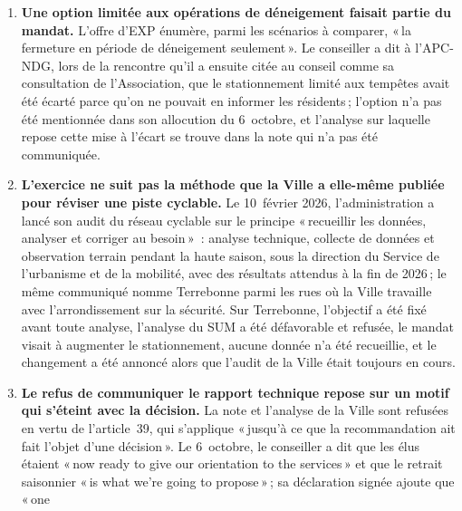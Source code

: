 \documentclass[11pt,letterpaper]{article}
\begin{document}
\begin{enumerate}[nosep]
\item \begin{minipage}[t]{\linewidth}\textbf{Une option limitée aux opérations de déneigement
    faisait partie du mandat.} L'offre d'EXP énumère, parmi les scénarios à
    comparer, «\,la fermeture en période de déneigement seulement\,». Le
    conseiller a dit à l'APC-NDG, lors de la rencontre qu'il a ensuite citée
    au conseil comme sa consultation de l'Association, que le stationnement
    limité aux tempêtes avait été écarté parce qu'on ne pouvait en informer
    les résidents\,; l'option n'a pas été mentionnée dans son allocution du
    6~octobre, et l'analyse sur laquelle repose cette mise à l'écart se
    trouve dans la note qui n'a pas été communiquée.\end{minipage}\vspace{0.35em}
\item \begin{minipage}[t]{\linewidth}\textbf{L'exercice ne suit pas la méthode que la Ville a elle-même
    publiée pour réviser une piste cyclable.} Le 10~février 2026,
    l'administration a lancé son audit du réseau cyclable sur le principe
    «\,recueillir les données, analyser et corriger au besoin\,»~: analyse
    technique, collecte de données et observation terrain pendant la haute
    saison, sous la direction du Service de l'urbanisme et de la mobilité,
    avec des résultats attendus à la fin de 2026\,; le même communiqué nomme
    Terrebonne parmi les rues où la Ville travaille avec l'arrondissement sur
    la sécurité. Sur Terrebonne, l'objectif a été fixé avant toute analyse,
    l'analyse du SUM a été défavorable et refusée, le mandat visait à
    augmenter le stationnement, aucune donnée n'a été recueillie, et le
    changement a été annoncé alors que l'audit de la Ville était toujours en
    cours.\end{minipage}\vspace{0.35em}
\item \begin{minipage}[t]{\linewidth}\textbf{Le refus de communiquer le rapport technique repose sur un
    motif qui s'éteint avec la décision.} La note et l'analyse de la Ville sont
    refusées en vertu de l'article~39, qui s'applique «\,jusqu'à ce que la
    recommandation ait fait l'objet d'une décision\,». Le 6~octobre, le
    conseiller a dit que les élus étaient «\,now ready to give our
    orientation to the services\,» et que le retrait saisonnier «\,is what
    we're going to propose\,»\,; sa déclaration signée ajoute que «\,one

\end{minipage}
\end{enumerate}
\end{document}
